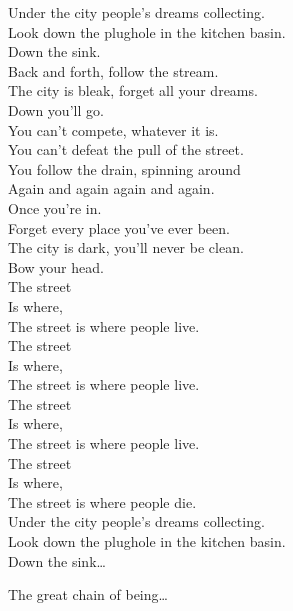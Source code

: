 Under the city people's dreams collecting. \\
Look down the plughole in the kitchen basin. \\

Down the sink. \\
Back and forth, follow the stream. \\
The city is bleak, forget all your dreams. \\
Down you'll go. \\
You can't compete, whatever it is. \\
You can't defeat the pull of the street. \\
You follow the drain, spinning around \\
Again and again again and again. \\
Once you're in. \\
Forget every place you've ever been. \\
The city is dark, you'll never be clean. \\
Bow your head. \\

The street \\
Is where, \\
The street is where people live. \\
The street \\
Is where, \\
The street is where people live. \\
The street \\
Is where, \\
The street is where people live. \\
The street \\
Is where, \\
The street is where people die. \\

Under the city people's dreams collecting. \\
Look down the plughole in the kitchen basin. \\

Down the sink… \\





The great chain of being… \\

